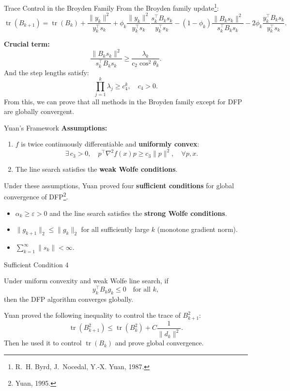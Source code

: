 \documentclass[aspectratio=169]{beamer}
\DeclareMathOperator{\tr}{tr}
\begin{document}
	\begin{frame}{Trace Control in the Broyden Family}
		From the Broyden family update\footnote{R.~H. Byrd, J.~Nocedal, Y.-X. Yuan, 1987.}:
		\[
		\operatorname{tr}(B_{k+1}) = \operatorname{tr}(B_k) + \frac{\|y_k\|^2}{y_k^\top s_k}
		+ \phi_k \frac{\|y_k\|^2}{y_k^\top s_k}\frac{s_k^\top B_k s_k}{y_k^\top s_k}
		- (1-\phi_k)\frac{\|B_k s_k\|^2}{s_k^\top B_k s_k}
		- 2\phi_k\frac{y_k^\top B_k s_k}{y_k^\top s_k}.
		\]
		
		\textbf{Crucial term:} 
		\[
		\frac{\|B_k s_k\|^2}{s_k^\top B_k s_k} \ge \frac{\lambda_k}{c_2 \cos^2\theta_k}.
		\]
		And the step lengths satisfy:
		\[
		\prod_{j=1}^k \lambda_j \ge c_4^k,\quad c_4>0.
		\]
		From this, we can prove that all methods in the Broyden family except for DFP are globally convergent.
	\end{frame}
	
	\begin{frame}{Yuan's Framework}
		\textbf{Assumptions:}
		\begin{enumerate}
			\item[(i)] \(f\) is twice continuously differentiable and \textbf{uniformly convex}:
			\[
			\exists\,c_3>0,\quad p^\top\nabla^2 f(x)p \ge c_3\|p\|^2,\quad \forall p,x.
			\]
			\item[(ii)] The line search satisfies the \textbf{weak Wolfe conditions}.
		\end{enumerate}
		
		Under these assumptions, Yuan proved four \textbf{sufficient conditions} for global convergence of DFP\footnote{Yuan, 1995.}.
		\begin{itemize}
			\item $\alpha_k \ge \varepsilon > 0$ and the line search satisfies the \textbf{strong Wolfe conditions}.
			\item $\|g_{k+1}\|_2 \le \|g_k\|_2$ for all sufficiently large $k$ (monotone gradient norm).
			\item $\displaystyle\sum_{k=1}^{\infty} \|s_k\| < \infty$.
		\end{itemize}
	\end{frame}
	
	\begin{frame}{Sufficient Condition 4}
		\begin{theorem}[Yuan, 1995]
			Under uniform convexity and weak Wolfe line search, if
			\[
			y_k^\top B_k g_k \le 0 \quad \text{for all } k,
			\]
			then the DFP algorithm converges globally.
		\end{theorem}
		Yuan proved the following inequality to control the trace of $B_{k+1}^2$:
		\[
		\tr(B_{k+1}^2) \le \tr(B_k^2) + C \frac{1}{\|d_k\|^2}.
		\]
		Then he used it to control $\tr(B_k)$ and prove global convergence.
	\end{frame}
	
\end{document}
